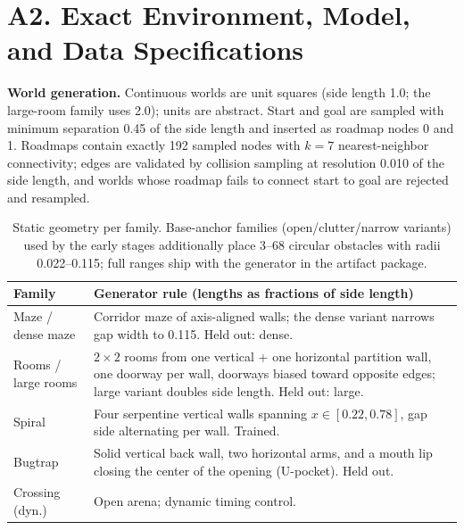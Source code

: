\documentclass[letterpaper]{article} %
\begin{document}
\section{A2. Exact Environment, Model, and Data Specifications}

\textbf{World generation.} Continuous worlds are unit squares (side length 1.0; the large-room family uses 2.0); units are abstract. Start and goal are sampled with minimum separation 0.45 of the side length and inserted as roadmap nodes 0 and 1. Roadmaps contain exactly 192 sampled nodes with $k{=}7$ nearest-neighbor connectivity; edges are validated by collision sampling at resolution 0.010 of the side length, and worlds whose roadmap fails to connect start to goal are rejected and resampled.

\begin{table}[h]
\centering
\scriptsize
\setlength{\tabcolsep}{2.5pt}
\begin{tabular}{@{}lp{5.6cm}@{}}
\toprule
Family & Generator rule (lengths as fractions of side length) \\
\midrule
Maze / dense maze & Corridor maze of axis-aligned walls; the dense variant narrows gap width to 0.115. Held out: dense. \\
Rooms / large rooms & $2{\times}2$ rooms from one vertical + one horizontal partition wall, one doorway per wall, doorways biased toward opposite edges; large variant doubles side length. Held out: large. \\
Spiral & Four serpentine vertical walls spanning $x \in [0.22, 0.78]$, gap side alternating per wall. Trained. \\
Bugtrap & Solid vertical back wall, two horizontal arms, and a mouth lip closing the center of the opening (U-pocket). Held out. \\
Crossing (dyn.) & Open arena; dynamic timing control. \\
\bottomrule
\end{tabular}
\caption{Static geometry per family. Base-anchor families (open/clutter/narrow variants) used by the early stages additionally place 3--68 circular obstacles with radii 0.022--0.115; full ranges ship with the generator in the artifact package.}
\label{tab:envspec}
\end{table}
\end{document}
